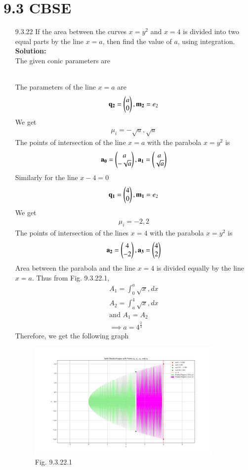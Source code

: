 \documentclass[journal]{IEEEtran}
\begin{document}
\section{9.3 CBSE}
\begin{enumerate}
\item [9.3.22] If the area between the curves $x=y^2$ and $x=4$ is divided into two equal parts by the line $x=a$, then find the value of $a$, using integration.\\
\textbf{Solution:}\\
The given conic parameters are
\begin{table}[h!]
      \centering
      
      \caption{}
\end{table}\\
The parameters of the line $x=a$ are
\begin{align}
    \mathbf{q_2} = \begin{pmatrix}a\\0\end{pmatrix}, \mathbf{m_2} = e_2
\end{align}
We get
\begin{align}
    \mu_i = -\sqrt{a},\sqrt{a}
\end{align}
The points of intersection of the line $x=a$ with the parabola $x=y^2$ is 
\begin{align}
    \mathbf{a_0} = \begin{pmatrix}a\\-\sqrt{a}\end{pmatrix}, \mathbf{a_1} = \begin{pmatrix}a\\\sqrt{a}\end{pmatrix}
\end{align}
Similarly for the line $x-4=0$
\begin{align}
    \mathbf{q_1} = \begin{pmatrix}4\\0\end{pmatrix}, \mathbf{m_1} = e_2
\end{align}
We get
\begin{align}
    \mu_i = -2,2
\end{align}
The points of intersection of the lines $x=4$ with the parabola $x=y^2$ is
\begin{align}
    \mathbf{a_2} = \begin{pmatrix}4\\-2\end{pmatrix}, \mathbf{a_3} = \begin{pmatrix}4\\2\end{pmatrix}
\end{align}
Area between the parabola and the line $x=4$ is divided equally by the line $x=a$. Thus from Fig. 9.3.22.1,
\begin{align}
    A_1 = \int_0^a \sqrt{x}, dx\\
    A_2 = \int_a^4 \sqrt{x}, dx\\
    \text{and } A_1 = A_2\\
    \implies a = 4^{\frac{2}{3}}
\end{align}
Therefore, we get the following graph
\begin{figure}[h!]
    \centering
    \includegraphics[width=9.5cm]{figs/figure.png}
    \caption*{Fig. 9.3.22.1}
    \label{}
\end{figure}
\end{enumerate}
\end{document}
